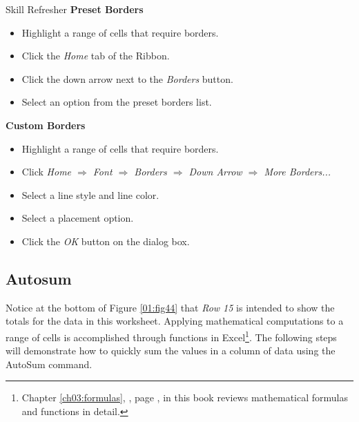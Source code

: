 \begin{center}
	\begin{sklbox}{Skill Refresher}
		\textbf{Preset Borders}
		\\
		\begin{itemize}
			\setlength{\itemsep}{0pt}
			\setlength{\parskip}{0pt}
			\setlength{\parsep}{0pt}
			
			\item Highlight a range of cells that require borders.
			\item Click the \textit{Home} tab of the Ribbon.
			\item Click the down arrow next to the \textit{Borders} button.
			\item Select an option from the preset borders list.
			
		\end{itemize}

		\hfill \break
		\textbf{Custom Borders}
		\\
		\begin{itemize}
			\setlength{\itemsep}{0pt}
			\setlength{\parskip}{0pt}
			\setlength{\parsep}{0pt}
			
			\item Highlight a range of cells that require borders.
			\item Click \textit{Home $ \Rightarrow $ Font $ \Rightarrow $ Borders $ \Rightarrow $ Down Arrow $ \Rightarrow $ More Borders...}
			\item Select a line style and line color.
			\item Select a placement option.
			\item Click the \textit{OK} button on the dialog box.
			
		\end{itemize}

	\end{sklbox}
\end{center}

\subsection{Autosum}

Notice at the bottom of Figure \ref{01:fig44} that \textit{Row 15} is intended to show the totals for the data in this worksheet. Applying mathematical computations to a range of cells is accomplished through functions in Excel\footnote{Chapter \ref{ch03:formulas}, , page \pageref{ch03:formulas}, in this book reviews mathematical formulas and functions in detail.}. The following steps will demonstrate how to quickly sum the values in a column of data using the AutoSum command.


